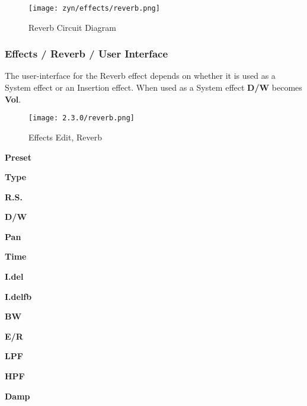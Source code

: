 \begin{figure}[H]
   \centering
   \texttt{[image: zyn/effects/reverb.png]}
   \caption{Reverb Circuit Diagram}
   \label{fig:reverb_circuit_diagram}
\end{figure}

\subsubsection{Effects / Reverb / User Interface}
\label{subsubsec:effects_edit_reverb_ui}

   The user-interface for the Reverb effect depends on whether it is used as a
   System effect or an Insertion effect. When used as a System effect \textbf{D/W} becomes \textbf{Vol}.
\iffalse
   Observr \figureref{fig:effects_edit_reverb}, where
   the Insertion mode is shown.  In the System mode, only the light-blue
   portion of the user-interface appears.
\fi
\begin{figure}[H]
   \centering
   \texttt{[image: 2.3.0/reverb.png]}
   \caption{Effects Edit, Reverb}
   \label{fig:effects_edit_reverb}
\end{figure}

   \begin{enumber}
      \item \textbf{Preset}
      \item \textbf{Type}
      \item \textbf{R.S.}
      \item \textbf{D/W}
      \item \textbf{Pan}
      \item \textbf{Time}
      \item \textbf{I.del}
      \item \textbf{I.delfb}
      \item \textbf{BW}
      \item \textbf{E/R}
      \item \textbf{LPF}
      \item \textbf{HPF}
      \item \textbf{Damp}
   \end{enumber}
\iffalse
???
  There is a fourth type we have screen captures for, but we can't seem
  to navigate to them now!  Are these now out-of-date screen captures?
This belongs elsewhere
   \begin{enumber}
      \item \textbf{FX No.}
      \item \textbf{bypass}
      \item \textbf{EffType}
      \item \textbf{Send To}
      \item \textbf{C}
      \item \textbf{P}
      \item \textbf{Close}
   \end{enumber}
\fi
   \setcounter{ItemCounter}{0}      %

